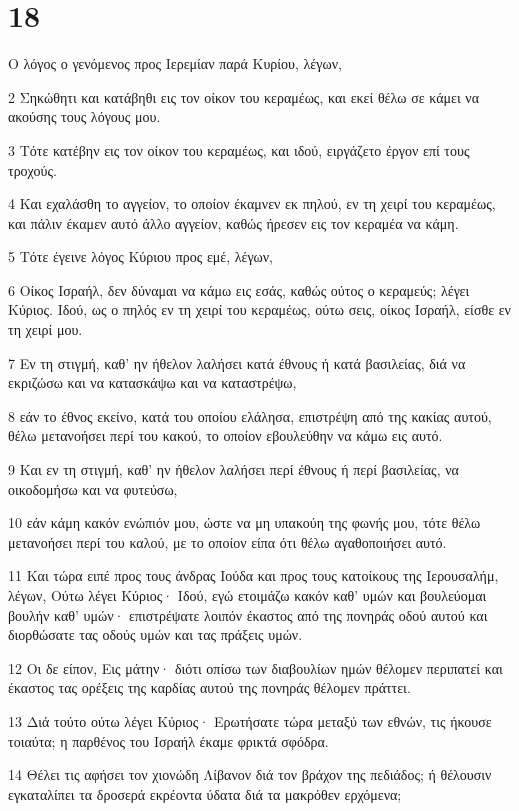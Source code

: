 \chapter{18}

\par Ο λόγος ο γενόμενος προς Ιερεμίαν παρά Κυρίου, λέγων,
\par 2 Σηκώθητι και κατάβηθι εις τον οίκον του κεραμέως, και εκεί θέλω σε κάμει να ακούσης τους λόγους μου.
\par 3 Τότε κατέβην εις τον οίκον του κεραμέως, και ιδού, ειργάζετο έργον επί τους τροχούς.
\par 4 Και εχαλάσθη το αγγείον, το οποίον έκαμνεν εκ πηλού, εν τη χειρί του κεραμέως, και πάλιν έκαμεν αυτό άλλο αγγείον, καθώς ήρεσεν εις τον κεραμέα να κάμη.
\par 5 Τότε έγεινε λόγος Κύριου προς εμέ, λέγων,
\par 6 Οίκος Ισραήλ, δεν δύναμαι να κάμω εις εσάς, καθώς ούτος ο κεραμεύς; λέγει Κύριος. Ιδού, ως ο πηλός εν τη χειρί του κεραμέως, ούτω σεις, οίκος Ισραήλ, είσθε εν τη χειρί μου.
\par 7 Εν τη στιγμή, καθ' ην ήθελον λαλήσει κατά έθνους ή κατά βασιλείας, διά να εκριζώσω και να κατασκάψω και να καταστρέψω,
\par 8 εάν το έθνος εκείνο, κατά του οποίου ελάλησα, επιστρέψη από της κακίας αυτού, θέλω μετανοήσει περί του κακού, το οποίον εβουλεύθην να κάμω εις αυτό.
\par 9 Και εν τη στιγμή, καθ' ην ήθελον λαλήσει περί έθνους ή περί βασιλείας, να οικοδομήσω και να φυτεύσω,
\par 10 εάν κάμη κακόν ενώπιόν μου, ώστε να μη υπακούη της φωνής μου, τότε θέλω μετανοήσει περί του καλού, με το οποίον είπα ότι θέλω αγαθοποιήσει αυτό.
\par 11 Και τώρα ειπέ προς τους άνδρας Ιούδα και προς τους κατοίκους της Ιερουσαλήμ, λέγων, Ούτω λέγει Κύριος· Ιδού, εγώ ετοιμάζω κακόν καθ' υμών και βουλεύομαι βουλήν καθ' υμών· επιστρέψατε λοιπόν έκαστος από της πονηράς οδού αυτού και διορθώσατε τας οδούς υμών και τας πράξεις υμών.
\par 12 Οι δε είπον, Εις μάτην· διότι οπίσω των διαβουλίων ημών θέλομεν περιπατεί και έκαστος τας ορέξεις της καρδίας αυτού της πονηράς θέλομεν πράττει.
\par 13 Διά τούτο ούτω λέγει Κύριος· Ερωτήσατε τώρα μεταξύ των εθνών, τις ήκουσε τοιαύτα; η παρθένος του Ισραήλ έκαμε φρικτά σφόδρα.
\par 14 Θέλει τις αφήσει τον χιονώδη Λίβανον διά τον βράχον της πεδιάδος; ή θέλουσιν εγκαταλίπει τα δροσερά εκρέοντα ύδατα διά τα μακρόθεν ερχόμενα;
